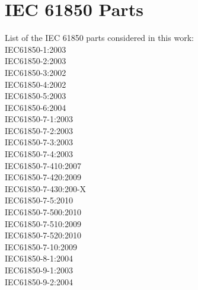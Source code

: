 \section{IEC 61850 Parts}



List of the IEC 61850 parts considered 
in this work:  \\
IEC61850-1:2003 	\cite{IEC61850-1:2003} \\
IEC61850-2:2003		\cite{IEC61850-2:2003} \\
IEC61850-3:2002		\cite{IEC61850-3:2002} \\
IEC61850-4:2002		\cite{IEC61850-4:2002} \\
IEC61850-5:2003		\cite{IEC61850-5:2003} \\
IEC61850-6:2004		\cite{IEC61850-6:2004}  \\
IEC61850-7-1:2003	\cite{IEC61850-7-1:2003} \\
IEC61850-7-2:2003	\cite{IEC61850-7-2:2003} \\
IEC61850-7-3:2003	\cite{IEC61850-7-3:2003} \\
IEC61850-7-4:2003	\cite{IEC61850-7-4:2003} \\
IEC61850-7-410:2007	\cite{IEC61850-7-410:2007} \\
IEC61850-7-420:2009	\cite{IEC61850-7-420:2009} \\
IEC61850-7-430:200-X\cite{IEC61850-7-430:200-X} \\
IEC61850-7-5:2010	\cite{IEC61850-7-5:2010} \\
IEC61850-7-500:2010	\cite{IEC61850-7-500:2010} \\
IEC61850-7-510:2009	\cite{IEC61850-7-510:2009} \\
IEC61850-7-520:2010	\cite{IEC61850-7-520:2010} \\
IEC61850-7-10:2009	\cite{IEC61850-7-10:2009} \\
IEC61850-8-1:2004	\cite{IEC61850-8-1:2004} \\
IEC61850-9-1:2003	\cite{IEC61850-9-1:2003} \\
IEC61850-9-2:2004	\cite{IEC61850-9-2:2004} \\ 


